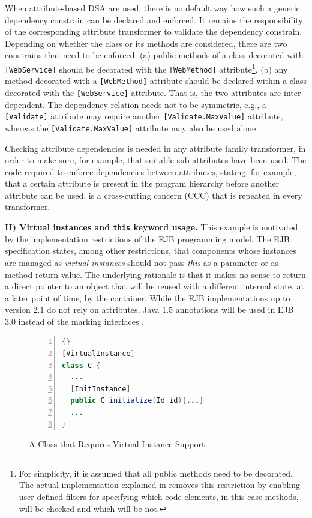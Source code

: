 When attribute-based DSA are used, there is no default way how such a generic dependency constrain can be declared and enforced. It remains the responsibility of the corresponding attribute transformer to validate the dependency constrain. Depending on whether the class or its methods are considered, there are two constrains that need to be enforced: (a) public methods of a class decorated with \texttt{[Web\-Servi\-ce]} should be decorated with the \texttt{[Web\-Method]} attribute\footnote{For simplicity, it is assumed that all public methods need to be decorated. The actual implementation explained in  removes this restriction by enabling user-defined filters for specifying which code elements, in this case methods, will be checked and which will be not.}, (b) any method decorated with a \texttt{[Web\-Method]} attribute should be declared within a class decorated with the \texttt{[Web\-Servi\-ce]} attribute. That is, the two attributes are inter-dependent. The dependency relation needs not to be symmetric, e.g., a \texttt{[Va\-li\-da\-te]} attribute may require another \texttt{[Va\-li\-da\-te.Max\-Va\-lue]} attribute, whereas the \texttt{[Va\-li\-da\-te.Max\-Va\-lue]} attribute may also be used alone.

Checking attribute dependencies is needed in any attribute family transformer, in order to make sure, for example, that suitable sub-attributes have been used. The code required to enforce dependencies between attributes, stating, for example, that a certain attribute is present in the program hierarchy before another attribute can be used, is a cross-cutting concern (CCC) that is repeated in every transformer.

\textbf{II) Virtual instances and \texttt{this} keyword usage.} This example is motivated by the implementation restrictions of the EJB \cite{www.ejb} programming model. The EJB specification states, among other restrictions, that components whose instances are managed as \textit{virtual instances} \cite{server.patterns.02} should not pass \textit{this} as a parameter or as method return value. The underlying rationale is that it makes no sense to return a direct pointer to an object that will be reused with a different internal state, at a later point of time, by the container. While the EJB implementations up to version 2.1 do not rely on attributes, Java 1.5 annotations will be used in EJB 3.0 \cite{ejb30} instead of the marking interfaces .

\begin{figure}[ht]
	\begin{center}
	\begin{minipage}{5cm}
	\begin{scriptsize}
\begin{lstlisting}[numbers=left,language=Java,frame=leftline]{}
[VirtualInstance]
class C {
  ...
  [InitInstance]
  public C initialize(Id id){...}
  ...
}
\end{lstlisting}
\end{scriptsize}
\end{minipage}
\end{center}
\caption{A Class that Requires Virtual Instance Support}
\label{fig:vinstance}
\end{figure}

